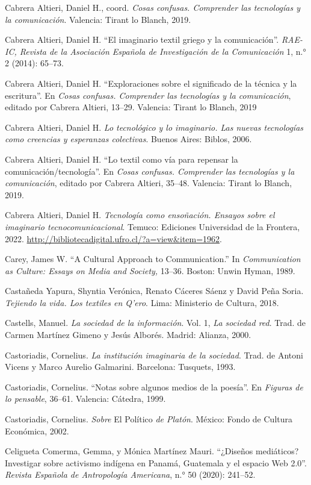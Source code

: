 \documentclass{tufte-handout}
\begin{document}
\begin{hangparas}{.25in}{1}
Cabrera Altieri, Daniel H., coord. \emph{Cosas confusas. Comprender las
tecnologías y la comunicación}. Valencia: Tirant lo Blanch, 2019.

Cabrera Altieri, Daniel H. ``El imaginario textil griego y la
comunicación''. \emph{RAE-IC, Revista de la Asociación Española de
Investigación de la Comunicación} 1, n.° 2 (2014): 65--73.

Cabrera Altieri, Daniel H. ``Exploraciones sobre el significado de la
técnica y la escritura''. En \emph{Cosas confusas. Comprender las
tecnologías y la comunicación}, editado por Cabrera Altieri, 13--29.
Valencia: Tirant lo Blanch, 2019

Cabrera Altieri, Daniel H. \emph{Lo tecnológico y lo imaginario. Las
nuevas tecnologías como creencias y esperanzas colectivas}. Buenos
Aires: Biblos, 2006.

Cabrera Altieri, Daniel H. ``Lo textil como vía para repensar la
comunicación/tecnología''. En \emph{Cosas confusas. Comprender las
tecnologías y la comunicación}, editado por Cabrera Altieri, 35--48.
Valencia: Tirant lo Blanch, 2019.

Cabrera Altieri, Daniel H. \emph{Tecnología como ensoñación. Ensayos
sobre el imaginario tecnocomunicacional}. Temuco: Ediciones Universidad
de la Frontera, 2022.
\url{http://bibliotecadigital.ufro.cl/?a=view\&item=1962}.

Carey, James W. ``A Cultural Approach to Communication.'' In
\emph{Communication as Culture: Essays on Media and Society, }13--36.
Boston: Unwin Hyman, 1989.

Castañeda Yapura, Shyntia Verónica, Renato Cáceres Sáenz y David Peña
Soria. \emph{Tejiendo la vida. Los textiles en Q'ero}. Lima: Ministerio
de Cultura, 2018.

Castells, Manuel. \emph{La sociedad de la información}. Vol. 1, \emph{La
sociedad red}. Trad. de Carmen Martínez Gimeno y Jesús Alborés. Madrid:
Alianza, 2000.

Castoriadis, Cornelius. \emph{La institución imaginaria de la sociedad}.
Trad. de Antoni Vicens y Marco Aurelio Galmarini. Barcelona: Tusquets,
1993.

Castoriadis, Cornelius. ``Notas sobre algunos medios de la poesía''. En
\emph{Figuras de lo pensable}, 36--61. Valencia: Cátedra, 1999.

Castoriadis, Cornelius. \emph{Sobre} El Político \emph{de Platón}.
México: Fondo de Cultura Económica, 2002.

Celigueta Comerma, Gemma, y Mónica Martínez Mauri. ``¿Diseños
mediáticos? Investigar sobre activismo indígena en Panamá, Guatemala y
el espacio Web 2.0''. \emph{Revista Española de Antropología Americana},
n.° 50 (2020): 241--52.


\end{hangparas}
\end{document}
